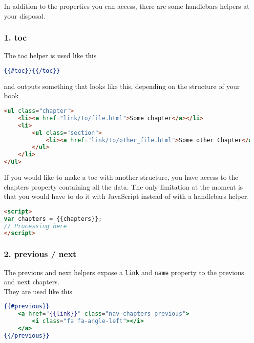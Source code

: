 \documentclass{article}
\begin{document}
In addition to the properties you can access, there are some handlebars helpers
at your disposal.\\

\subsubsection{1. toc}
\label{1. toc}
\label{1-toc}

The toc helper is used like this\\
\begin{lstlisting}[language=handlebars]
{{#toc}}{{/toc}}

\end{lstlisting}

and outputs something that looks like this, depending on the structure of your
book\\
\begin{lstlisting}[language=html]
<ul class="chapter">
    <li><a href="link/to/file.html">Some chapter</a></li>
    <li>
        <ul class="section">
            <li><a href="link/to/other_file.html">Some other Chapter</a></li>
        </ul>
    </li>
</ul>

\end{lstlisting}

If you would like to make a toc with another structure, you have access to the
chapters property containing all the data. The only limitation at the moment
is that you would have to do it with JavaScript instead of with a handlebars
helper.\\
\begin{lstlisting}[language=html]
<script>
var chapters = {{chapters}};
// Processing here
</script>

\end{lstlisting}

\subsubsection{2. previous / next}
\label{2. previous / next}
\label{2-previous-next}

The previous and next helpers expose a \lstinline|link| and \lstinline|name| property to the
previous and next chapters.\\

They are used like this\\
\begin{lstlisting}[language=handlebars]
{{#previous}}
    <a href="{{link}}" class="nav-chapters previous">
        <i class="fa fa-angle-left"></i>
    </a>
{{/previous}}

\end{lstlisting}
\end{document}
